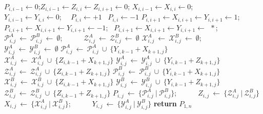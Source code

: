 \documentclass[12pt]{article}
\begin{document}
\begin{algorithm}
\caption{Partizan-Normal-Dom-Paths}\label{algoritmo1}
\begin{algorithmic}[1]
  \State $P_{i,i-1}\leftarrow 0$;\hspace{2cm}$Z_{i,i-1}\leftarrow Z_{i,i}\leftarrow Z_{i,i+1}\leftarrow 0$;
  \State $X_{i,i-1}\leftarrow X_{i,i}\leftarrow 0$;\ \ \ \ \ $Y_{i,i-1}\leftarrow Y_{i,i}\leftarrow 0$;
    \State\ \ $P_{i,i}\leftarrow +1$
  \Else\ $P_{i,i}\leftarrow -1$
  \EndIf
    \State $P_{i,i+1}\leftarrow X_{i,i+1}\leftarrow Y_{i,i+1}\leftarrow 1$; 
  \Else{}
    \State\ \ $P_{i,i+1}\leftarrow X_{i,i+1}\leftarrow Y_{i,i+1}\leftarrow -1$;
  \Else\ $P_{i,i+1}\leftarrow X_{i,i+1}\leftarrow Y_{i,i+1}\leftarrow\ \ *$;
  \EndIf
  \EndIf
\EndFor
{}
    \State $\mathcal{P}_{i,j}^A\ \leftarrow\ \mathcal{P}_{i,j}^B\ \leftarrow\ \emptyset$;\ \ \ \ \ \ $\mathcal{Z}_{i,j}^A\ \leftarrow\ \mathcal{Z}_{i,j}^B\ \leftarrow\ \emptyset$
    \State$\mathcal{X}_{i,j}^A\ \leftarrow\ \mathcal{X}_{i,j}^B\ \leftarrow\ \emptyset$;\ \ \ \ \ \ $\mathcal{Y}_{i,j}^A\ \leftarrow\ \mathcal{Y}_{i,j}^B\ \leftarrow\ \emptyset$
        \State $\mathcal{P}^A_{i,j}\ \leftarrow\  \mathcal{P}^A_{i,j}\ \cup\ \{Y_{i,k-1}+X_{k+1,j}\}$
        \State $\mathcal{X}^A_{i,j}\ \leftarrow\  \mathcal{X}^A_{i,j}\ \cup\ \{Z_{i,k-1}+X_{k+1,j}\}$
        \State $\mathcal{Y}^A_{i,j}\ \leftarrow\  \mathcal{Y}^A_{i,j}\ \cup\ \{Y_{i,k-1}+Z_{k+1,j}\}$
        \State $\mathcal{Z}^A_{i,j}\ \leftarrow\  \mathcal{Z}^A_{i,j}\ \cup\ \{Z_{i,k-1}+Z_{k+1,j}\}$
      \EndIf
        \State $\mathcal{P}^B_{i,j}\ \leftarrow\  \mathcal{P}^B_{i,j}\ \cup\ \{Y_{i,k-1}+X_{k+1,j}\}$
        \State $\mathcal{X}^B_{i,j}\ \leftarrow\  \mathcal{X}^B_{i,j}\ \cup\ \{Z_{i,k-1}+X_{k+1,j}\}$
        \State $\mathcal{Y}^B_{i,j}\ \leftarrow\  \mathcal{Y}^B_{i,j}\ \cup\ \{Y_{i,k-1}+Z_{k+1,j}\}$
        \State $\mathcal{Z}^B_{i,j}\ \leftarrow\  \mathcal{Z}^B_{i,j}\ \cup\ \{Z_{i,k-1}+Z_{k+1,j}\}$
      \EndIf
    \EndFor
    \State $P_{i,j}\ \leftarrow\  \{\mathcal{P}^A_{i,j}\ |\ \mathcal{P}^B_{i,j}\}$;\ \ \ \ \ \ $Z_{i,j}\ \leftarrow\  \{\mathcal{Z}^A_{i,j}\ |\ \mathcal{Z}^B_{i,j}\}$
    \State $X_{i,j}\ \leftarrow\  \{\mathcal{X}^A_{i,j}\ |\ \mathcal{X}^B_{i,j}\}$;\ \ \ \ \ \ $Y_{i,j}\ \leftarrow\  \{\mathcal{Y}^A_{i,j}\ |\ \mathcal{Y}^B_{i,j}\}$
  \EndFor
\EndFor
\State \textbf{return} $P_{1,n}$
\end{algorithmic}
\end{algorithm}
\end{document}

